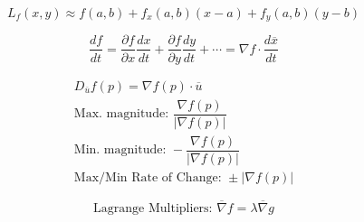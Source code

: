 \documentclass[12pt]{article}
\begin{document}
\vspace{-30pt}

\begin{multicols}{2}

  \begin{equation*}
    L_f(x,y)\approx f(a,b) + f_x(a,b)(x-a) + f_y(a,b)(y-b)
  \end{equation*}
    
  \begin{equation*}
    \dfrac{df}{dt}=\dfrac{\partial f}{\partial x}\dfrac{dx}{dt} + \dfrac{\partial f}{\partial y}\dfrac{dy}{dt} + \cdots = \nabla f\cdot\frac{d\overline{x}}{dt}
  \end{equation*}

\end{multicols}

\vspace{-30pt}

\begin{multicols}{2}

  \begin{equation*}
    \begin{split}
    D_{\overline{u}}f(p)=\nabla f(p)\cdot\overline{u}\\
    \text{Max. magnitude: } \dfrac{\nabla f(p)}{|\nabla f(p)|}\\
    \text{Min. magnitude: } -\dfrac{\nabla f(p)}{|\nabla f(p)|}\\
    \text{Max/Min Rate of Change: }\pm|\nabla f(p)|
  \end{split}
  \end{equation*}
    
  \begin{equation*}
    \text{Lagrange Multipliers: }\overline{\nabla}f=\lambda\overline{\nabla}g
  \end{equation*}

\end{multicols}

\vspace{-100pt}
\end{document}
